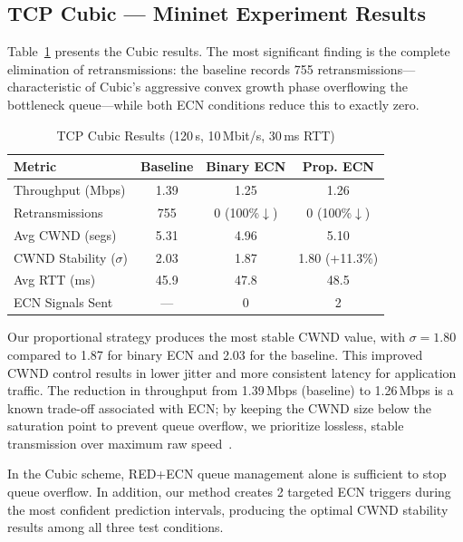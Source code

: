 \documentclass[journal]{IEEEtran}
\begin{document}
\subsection{TCP Cubic --- Mininet Experiment Results}

Table~\ref{tab:cubic} presents the Cubic results. The most significant finding is the complete elimination of retransmissions: the baseline records 755 retransmissions---characteristic of Cubic's aggressive convex growth phase overflowing the bottleneck queue---while both ECN conditions reduce this to exactly zero.

\begin{table}[!t]
\renewcommand{\arraystretch}{1.3}
\caption{TCP Cubic Results (120\,s, 10\,Mbit/s, 30\,ms RTT)}
\label{tab:cubic}
\centering
\begin{tabular}{lccc}
\toprule
\textbf{Metric} & \textbf{Baseline} & \textbf{Binary ECN} & \textbf{Prop. ECN} \\
\midrule
Throughput (Mbps)         & 1.39  & 1.25  & 1.26 \\
Retransmissions           & 755   & 0 (100\%$\downarrow$) & 0 (100\%$\downarrow$) \\
Avg CWND (segs)           & 5.31  & 4.96  & 5.10 \\
CWND Stability ($\sigma$) & 2.03  & 1.87  & 1.80 (+11.3\%) \\
Avg RTT (ms)              & 45.9  & 47.8  & 48.5 \\
ECN Signals Sent          & ---   & 0     & 2 \\
\bottomrule
\end{tabular}
\end{table}

Our proportional strategy produces the most stable CWND value, with $\sigma = 1.80$ compared to 1.87 for binary ECN and 2.03 for the baseline. This improved CWND control results in lower jitter and more consistent latency for application traffic. The reduction in throughput from 1.39\,Mbps (baseline) to 1.26\,Mbps is a known trade-off associated with ECN; by keeping the CWND size below the saturation point to prevent queue overflow, we prioritize lossless, stable transmission over maximum raw speed~\cite{aqm_lstm}.

In the Cubic scheme, RED+ECN queue management alone is sufficient to stop queue overflow. In addition, our method creates 2 targeted ECN triggers during the most confident prediction intervals, producing the optimal CWND stability results among all three test conditions.
\end{document}
